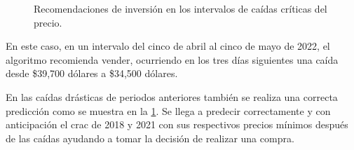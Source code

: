 \begin{figure}[h!]
	\centering
	\qquad
	\qquad
	\qquad
	
	\caption{Recomendaciones de inversión en los intervalos de caídas críticas del precio.}
	\label{fig33}
\end{figure}

En este caso, en un intervalo del cinco de abril al cinco de mayo de 2022, el algoritmo recomienda vender, ocurriendo en los tres días siguientes una caída desde \$39,700 dólares a \$34,500 dólares.

En las caídas drásticas de periodos anteriores  también se realiza una correcta predicción como se muestra en la \cref{fig33}. Se llega a predecir correctamente y con anticipación el crac de 2018 y 2021 con sus respectivos precios mínimos después de las caídas ayudando a tomar la decisión de realizar una compra.
